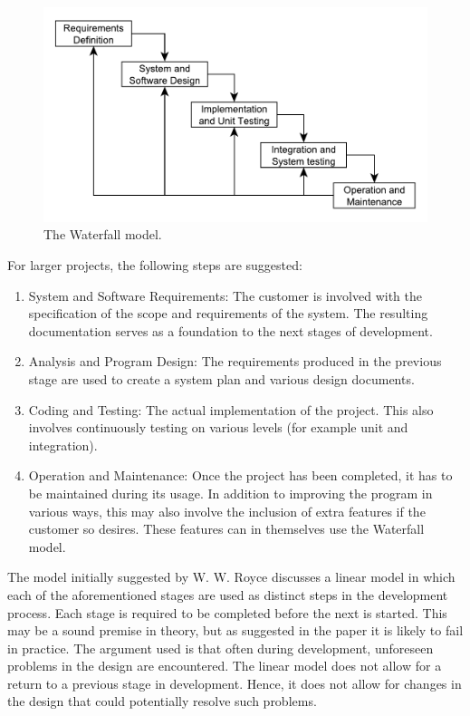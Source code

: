 \begin{figure}[ht!]
\centering
\includegraphics[width=150mm]{images/chapters/development_models/waterfall.pdf}
\caption{The Waterfall model.}
\label{waterfall}
\end{figure}

For larger projects, the following steps are suggested:
\begin{enumerate}
	\item System and Software Requirements: The customer is involved with the specification of the scope and requirements of the system. The resulting documentation serves as a foundation to the next stages of development.
	\item Analysis and Program Design: The requirements produced in the previous stage are used to create a system plan and various design documents.
	\item Coding and Testing: The actual implementation of the project. This also involves continuously testing on various levels (for example unit and integration).
	\item Operation and Maintenance: Once the project has been completed, it has to be maintained during its usage. In addition to improving the program in various ways, this may also involve the inclusion of extra features if the customer so desires. These features can in themselves use the Waterfall model.
\end{enumerate}

The model initially suggested by W. W. Royce discusses a linear model in which each of the aforementioned stages are used as distinct steps in the development process. Each stage is required to be completed before the next is started. This may be a sound premise in theory, but as suggested in the paper it is likely to fail in practice. The argument used is that often during development, unforeseen problems in the design are encountered. The linear model does not allow for a return to a previous stage in development. Hence, it does not allow for changes in the design that could potentially resolve such problems.

